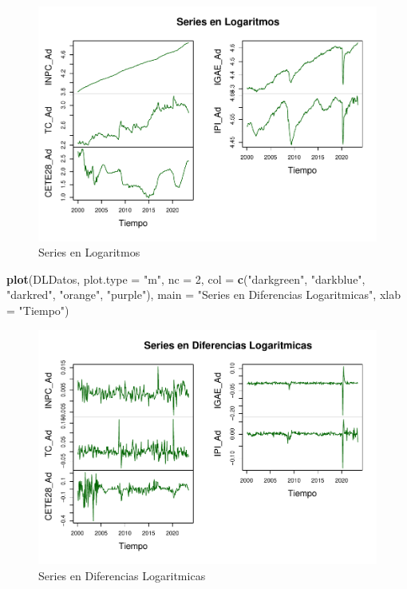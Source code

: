 \documentclass[
]{book}
\newenvironment{Shaded}{\begin{snugshade}}{\end{snugshade}}
\newcommand{\AttributeTok}[1]{\textcolor[rgb]{0.13,0.29,0.53}{#1}}
\newcommand{\DecValTok}[1]{\textcolor[rgb]{0.00,0.00,0.81}{#1}}
\newcommand{\FunctionTok}[1]{\textcolor[rgb]{0.13,0.29,0.53}{\textbf{#1}}}
\newcommand{\NormalTok}[1]{#1}
\newcommand{\StringTok}[1]{\textcolor[rgb]{0.31,0.60,0.02}{#1}}
\begin{document}
\begin{figure}

{\centering \includegraphics{Notas-Series-Tiempo_files/figure-latex/fig71-1} 

}

\caption{Series en Logaritmos}\label{fig:fig71}
\end{figure}

\begin{Shaded}
\begin{Highlighting}[]
\FunctionTok{plot}\NormalTok{(DLDatos, }
     \AttributeTok{plot.type =} \StringTok{"m"}\NormalTok{, }\AttributeTok{nc =} \DecValTok{2}\NormalTok{,}
     \AttributeTok{col =} \FunctionTok{c}\NormalTok{(}\StringTok{"darkgreen"}\NormalTok{, }\StringTok{"darkblue"}\NormalTok{, }\StringTok{"darkred"}\NormalTok{, }\StringTok{"orange"}\NormalTok{, }\StringTok{"purple"}\NormalTok{), }
     \AttributeTok{main =} \StringTok{"Series en Diferencias Logaritmicas"}\NormalTok{, }
     \AttributeTok{xlab =} \StringTok{"Tiempo"}\NormalTok{)}
\end{Highlighting}
\end{Shaded}

\begin{figure}

{\centering \includegraphics{Notas-Series-Tiempo_files/figure-latex/fig72-1} 

}

\caption{Series en Diferencias Logaritmicas}\label{fig:fig72}
\end{figure}
\end{document}
